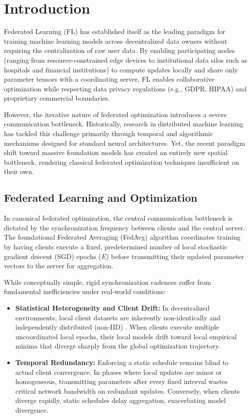 \chapter{Introduction}
\label{chap:intro}
Federated Learning (FL) \cite{kairouz2021advances, mcmahan2017communication} has established itself as the leading paradigm for training machine learning models across decentralized data owners without requiring the centralization of raw user data. By enabling participating nodes (ranging from resource-constrained edge devices to institutional data silos such as hospitals and financial institutions) to compute updates locally and share only parameter tensors with a coordinating server, FL enables collaborative optimization while respecting data privacy regulations (e.g., GDPR, HIPAA) and proprietary commercial boundaries.

However, the iterative nature of federated optimization introduces a severe communication bottleneck. Historically, research in distributed machine learning has tackled this challenge primarily through temporal and algorithmic mechanisms designed for standard neural architectures. Yet, the recent paradigm shift toward massive foundation models has created an entirely new spatial bottleneck, rendering classical federated optimization techniques insufficient on their own.

\section{Federated Learning and Optimization}
\label{sec:intro-fl-opt}
In canonical federated optimization, the central communication bottleneck is dictated by the synchronization frequency between clients and the central server. The foundational Federated Averaging (FedAvg) algorithm \cite{mcmahan2017communication} coordinates training by having clients execute a fixed, predetermined number of local stochastic gradient descent (SGD) epochs ($E$) before transmitting their updated parameter vectors to the server for aggregation. 

While conceptually simple, rigid synchronization cadences suffer from fundamental inefficiencies under real-world conditions:
\begin{itemize}
    \item \textbf{Statistical Heterogeneity and Client Drift:} In decentralized environments, local client datasets are inherently non-identically and independently distributed (non-IID) \cite{li2020federated, karimireddy2020scaffold}. When clients execute multiple uncoordinated local epochs, their local models drift toward local empirical minima that diverge sharply from the global optimization trajectory.
    \item \textbf{Temporal Redundancy:} Enforcing a static schedule remains blind to actual client convergence. In phases where local updates are minor or homogeneous, transmitting parameters after every fixed interval wastes critical network bandwidth on redundant updates. Conversely, when clients diverge rapidly, static schedules delay aggregation, exacerbating model divergence.
\end{itemize}

